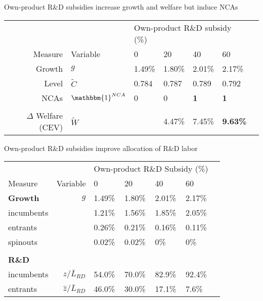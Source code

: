 \documentclass[english,usenames,dvipsnames]{beamer}
\begin{document}
\begin{frame}{Own-product R\&D subsidies increase growth and welfare but induce NCAs}\label{OI_RDsubsidy_table}
	\begin{table}
		\centering
		\small
		\begin{tabular}{rllllll}
			\toprule \toprule
			 &  & \multicolumn{4}{l}{Own-product R\&D subsidy (\%)} \vspace{3pt} \tabularnewline
			Measure &Variable & 0 & 20 & 40 & 60 \tabularnewline
			\midrule
			Growth & $g$ & 1.49\% & 1.80\% & 2.01\% & 2.17\% \tabularnewline
			Level & $\tilde{C}$  & 0.784 &  0.787 & 0.789 & 0.792 \tabularnewline 
			NCAs & $\mathbbm{1}^{NCA}$ & 0 & 0 & \alert{\textbf{1}} & \alert{\textbf{1}} \tabularnewline
			\tabularnewline
			$\Delta$ Welfare (CEV) & $\tilde{W}$  &  & 4.47\% & 7.45\% & \alert{\textbf{9.63\%}} \tabularnewline
			\bottomrule
		\end{tabular}
	\end{table}
	\hyperlink{plots:oi_rd_subsidies1}{} \hyperlink{plots:oi_rd_subsidies2}{}	
\end{frame}

\begin{frame}{Own-product R\&D subsidies improve allocation of R\&D labor}\label{oi_rd_subsidies:decomposition_growth_decrease}
	\begin{table}
		\centering
		\small
		\begin{tabular}{lrlllll}
			\toprule \toprule
			&  & \multicolumn{4}{l}{Own-product R\&D Subsidy (\%)} \vspace{3pt} \tabularnewline
			Measure & Variable & 0 & 20 & 40 & 60 \tabularnewline
			\midrule
			\textbf{Growth} & $g$ & 1.49\% & 1.80\% & 2.01\% & 2.17\% \tabularnewline
			\multicolumn{1}{l}{\quad incumbents} & & 1.21\% & 1.56\% & 1.85\% & 2.05\% \tabularnewline
			\multicolumn{1}{l}{\quad entrants} & & 0.26\% & 0.21\% & 0.16\% & 0.11\% \tabularnewline
			\multicolumn{1}{l}{\quad spinouts} &  & 0.02\% & 0.02\% & 0\% & 0\% \tabularnewline
			\tabularnewline
			\textbf{R\&D} & &  &  &  & \tabularnewline
			\multicolumn{1}{l}{\quad incumbents} & $z / \bar{L}_{RD}$ & 54.0\% & 70.0\% & 82.9\% & 92.4\% \tabularnewline
			\multicolumn{1}{l}{\quad entrants} & $\hat{z} / \bar{L}_{RD}$ & 46.0\% & 30.0\% & 17.1\% & 7.6\% \tabularnewline
			\bottomrule
		\end{tabular}
	\end{table}
\end{frame}
\end{document}
